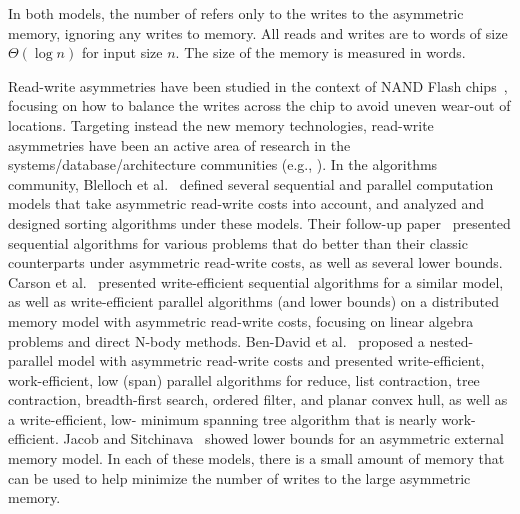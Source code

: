 In both models,
the number of  refers only to the writes to the
asymmetric memory, ignoring any writes to \local{}
memory.  All reads and writes are to words of size $\Theta(\log n)$
for input size $n$.  The size of the \local{} memory is measured in
words.

Read-write asymmetries have been studied in the context of NAND Flash
chips~\cite{BT06, Eppstein14, Gal05, ParkS09}, focusing on how to
balance the writes across the chip to avoid uneven wear-out of
locations.  Targeting instead the new memory technologies, read-write
asymmetries have been an active area of research in the
systems/database/architecture communities (e.g., \cite{Arulraj17sigmod,
  Bausch2012damon, Chen11, Chen2015pvldb, ChoL09, LeeIMB09,
  Oukid2016sigmod, Viglas12, Viglas14, wang2013wade, yang:iscas07,
  zhou2012writeback, ZhouZYZ09, ZWT13}).  In the algorithms community,
Blelloch et al.~\cite{BFGGS15} defined several sequential and parallel
computation models that take asymmetric read-write costs into account,
and analyzed and designed sorting algorithms under these models.
Their follow-up paper~\cite{blelloch2016efficient} presented
sequential algorithms for various problems that do better than their
classic counterparts under asymmetric read-write costs, as well as
several lower bounds.  Carson et al.~\cite{carson2016write} presented
write-efficient sequential algorithms for a similar model, as well as
write-efficient parallel algorithms (and lower bounds) on a
distributed memory model with asymmetric read-write costs, focusing on
linear algebra problems and direct N-body methods.  Ben-David et
al.~\cite{BBFGGMS16} proposed a nested-parallel model with asymmetric
read-write costs and presented write-efficient, work-efficient, low
\depth{} (span) parallel algorithms for reduce, list contraction, tree
contraction, breadth-first search, ordered filter, and planar convex
hull, as well as a write-efficient, low-\depth{} minimum spanning tree
algorithm that is nearly work-efficient.  Jacob and
Sitchinava~\cite{jacob2017} showed lower bounds for an asymmetric
external memory model.  In each of these models, there is a small
amount of \local{} memory that can be used to help minimize the number
of writes to the large asymmetric memory.

